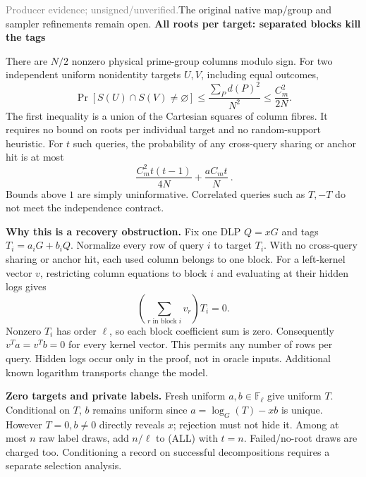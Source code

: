 \documentclass[10pt]{article}
\newcommand{\scope}{\textcolor{gray}{\footnotesize Producer evidence; unsigned/unverified.}}
\begin{document}
\scope\quad The original native map/group and sampler refinements remain open.
\newpage
{\Large\bf All roots per target: separated blocks kill the tags}

There are $N/2$ nonzero physical prime-group columns modulo sign. For two
independent uniform nonidentity targets $U,V$, including equal outcomes,
\[
 \Pr[S(U)\cap S(V)\ne\varnothing]
 \le \frac{\sum_P d(P)^2}{N^2}\le\frac{C_m^2}{2N}.
\]
The first inequality is a union of the Cartesian squares of column fibres.
It requires no bound on roots per individual target and no random-support
heuristic. For $t$ such queries, the probability of any cross-query sharing
or anchor hit is at most
\[
 \boxed{\ \frac{C_m^2t(t-1)}{4N}+\frac{aC_mt}{N}\ }.\tag{ALL}
\]
Bounds above $1$ are simply uninformative. Correlated queries such as $T,-T$
do not meet the independence contract.

\textbf{Why this is a recovery obstruction.} Fix one DLP $Q=xG$ and tags
$T_i=a_iG+b_iQ$. Normalize every row of query $i$ to target $T_i$. With no
cross-query sharing or anchor hit, each used column belongs to one block.
For a left-kernel vector $v$, restricting column equations to block $i$ and
evaluating at their hidden logs gives
\[
 \left(\sum_{r\text{ in block }i}v_r\right)T_i=0.
\]
Nonzero $T_i$ has order $\ell$, so each block coefficient sum is zero.
Consequently $v^Ta=v^Tb=0$ for every kernel vector. This permits any number
of rows per query. Hidden logs occur only in the proof, not in oracle inputs.
Additional known logarithm transports change the model.

\textbf{Zero targets and private labels.} Fresh uniform $a,b\in\mathbb F_\ell$
give uniform $T$. Conditional on $T$, $b$ remains uniform since
$a=\log_G(T)-xb$ is unique. However $T=0,b\ne0$ directly reveals $x$;
rejection must not hide it. Among at most $n$ raw label draws, add $n/\ell$
to (ALL) with $t=n$. Failed/no-root draws are charged too. Conditioning a
record on successful decompositions requires a separate selection analysis.
\end{document}
